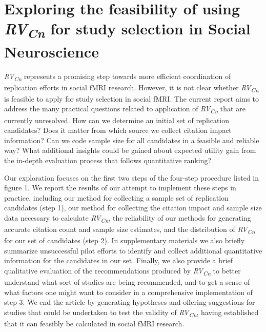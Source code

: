 \documentclass[
  man,floatsintext]{apa6}
\begin{document}
\hypertarget{exploring-the-feasibility-of-using-rvcn-for-study-selection-in-social-neuroscience}{%
\section{\texorpdfstring{Exploring the feasibility of using \emph{RV\textsubscript{Cn}} for study selection in Social Neuroscience}{Exploring the feasibility of using RVCn for study selection in Social Neuroscience}}\label{exploring-the-feasibility-of-using-rvcn-for-study-selection-in-social-neuroscience}}

\emph{RV\textsubscript{Cn}} represents a promising step towards more efficient coordination of replication efforts in social fMRI research. However, it is not clear whether \emph{RV\textsubscript{Cn}} is feasible to apply for study selection in social fMRI. The current report aims to address the many practical questions related to application of \emph{RV\textsubscript{Cn}} that are currently unresolved. How can we determine an initial set of replication candidates? Does it matter from which source we collect citation impact information? Can we code sample size for all candidates in a feasible and reliable way? What additional insights could be gained about expected utility gain from the in-depth evaluation process that follows quantitative ranking?

Our exploration focuses on the first two steps of the four-step procedure listed in figure 1. We report the results of our attempt to implement these steps in practice, including our method for collecting a sample set of replication candidates (step 1), our method for collecting the citation impact and sample size data necessary to calculate \emph{RV\textsubscript{Cn}}, the reliability of our methods for generating accurate citation count and sample size estimates, and the distribution of \emph{RV\textsubscript{Cn}} for our set of candidates (step 2). In supplementary materials we also briefly summarize unsuccessful pilot efforts to identify and collect additional quantitative information for the candidates in our set. Finally, we also provide a brief qualitative evaluation of the recommendations produced by \emph{RV\textsubscript{Cn}} to better understand what sort of studies are being recommended, and to get a sense of what factors one might want to consider in a comprehensive implementation of step 3. We end the article by generating hypotheses and offering suggestions for studies that could be undertaken to test the validity of \emph{RV\textsubscript{Cn}}, having established that it can feasibly be calculated in social fMRI research.
\end{document}
